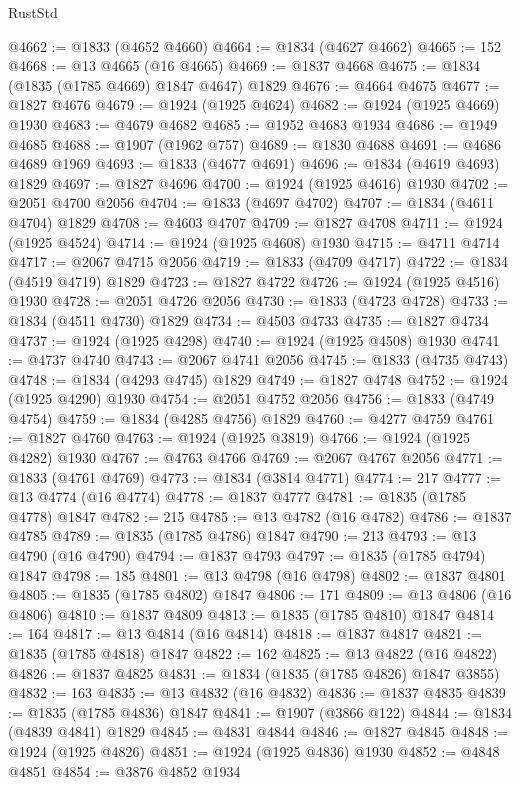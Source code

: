 \begin{lexlean}{RustStd}
\begin{coremodule}
{\begin{coremodule}
{{{{{@4662 := @1833 (@4652 @4660)
@4664 := @1834 (@4627 @4662)
@4665 := 152
@4668 := @13 @4665 (@16 @4665)
@4669 := @1837 @4668
@4675 := @1834 (@1835 (@1785 @4669) @1847 @4647) @1829
@4676 := @4664 @4675
@4677 := @1827 @4676
@4679 := @1924 (@1925 @4624)
@4682 := @1924 (@1925 @4669) @1930
@4683 := @4679 @4682
@4685 := @1952 @4683 @1934
@4686 := @1949 @4685
@4688 := @1907 (@1962 @757)
@4689 := @1830 @4688
@4691 := @4686 @4689 @1969
@4693 := @1833 (@4677 @4691)
@4696 := @1834 (@4619 @4693) @1829
@4697 := @1827 @4696
@4700 := @1924 (@1925 @4616) @1930
@4702 := @2051 @4700 @2056
@4704 := @1833 (@4697 @4702)
@4707 := @1834 (@4611 @4704) @1829
@4708 := @4603 @4707
@4709 := @1827 @4708
@4711 := @1924 (@1925 @4524)
@4714 := @1924 (@1925 @4608) @1930
@4715 := @4711 @4714
@4717 := @2067 @4715 @2056
@4719 := @1833 (@4709 @4717)
@4722 := @1834 (@4519 @4719) @1829
@4723 := @1827 @4722
@4726 := @1924 (@1925 @4516) @1930
@4728 := @2051 @4726 @2056
@4730 := @1833 (@4723 @4728)
@4733 := @1834 (@4511 @4730) @1829
@4734 := @4503 @4733
@4735 := @1827 @4734
@4737 := @1924 (@1925 @4298)
@4740 := @1924 (@1925 @4508) @1930
@4741 := @4737 @4740
@4743 := @2067 @4741 @2056
@4745 := @1833 (@4735 @4743)
@4748 := @1834 (@4293 @4745) @1829
@4749 := @1827 @4748
@4752 := @1924 (@1925 @4290) @1930
@4754 := @2051 @4752 @2056
@4756 := @1833 (@4749 @4754)
@4759 := @1834 (@4285 @4756) @1829
@4760 := @4277 @4759
@4761 := @1827 @4760
@4763 := @1924 (@1925 @3819)
@4766 := @1924 (@1925 @4282) @1930
@4767 := @4763 @4766
@4769 := @2067 @4767 @2056
@4771 := @1833 (@4761 @4769)
@4773 := @1834 (@3814 @4771)
@4774 := 217
@4777 := @13 @4774 (@16 @4774)
@4778 := @1837 @4777
@4781 := @1835 (@1785 @4778) @1847
@4782 := 215
@4785 := @13 @4782 (@16 @4782)
@4786 := @1837 @4785
@4789 := @1835 (@1785 @4786) @1847
@4790 := 213
@4793 := @13 @4790 (@16 @4790)
@4794 := @1837 @4793
@4797 := @1835 (@1785 @4794) @1847
@4798 := 185
@4801 := @13 @4798 (@16 @4798)
@4802 := @1837 @4801
@4805 := @1835 (@1785 @4802) @1847
@4806 := 171
@4809 := @13 @4806 (@16 @4806)
@4810 := @1837 @4809
@4813 := @1835 (@1785 @4810) @1847
@4814 := 164
@4817 := @13 @4814 (@16 @4814)
@4818 := @1837 @4817
@4821 := @1835 (@1785 @4818) @1847
@4822 := 162
@4825 := @13 @4822 (@16 @4822)
@4826 := @1837 @4825
@4831 := @1834 (@1835 (@1785 @4826) @1847 @3855)
@4832 := 163
@4835 := @13 @4832 (@16 @4832)
@4836 := @1837 @4835
@4839 := @1835 (@1785 @4836) @1847
@4841 := @1907 (@3866 @122)
@4844 := @1834 (@4839 @4841) @1829
@4845 := @4831 @4844
@4846 := @1827 @4845
@4848 := @1924 (@1925 @4826)
@4851 := @1924 (@1925 @4836) @1930
@4852 := @4848 @4851
@4854 := @3876 @4852 @1934
}}}}}
\end{coremodule}}
\end{coremodule}
\end{lexlean}

